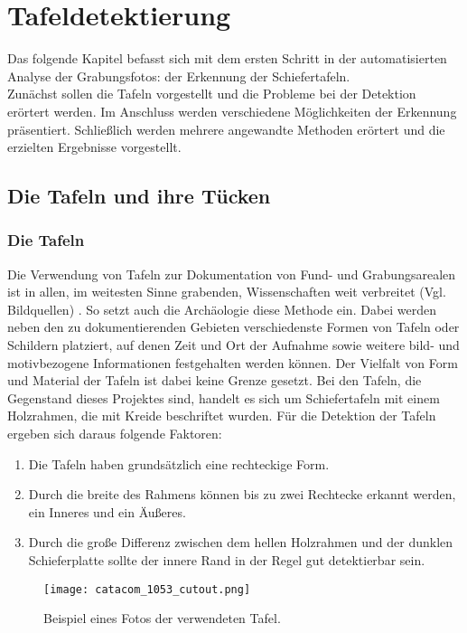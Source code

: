 \section{Tafeldetektierung}

Das folgende Kapitel befasst sich mit dem ersten Schritt in der automatisierten Analyse der Grabungsfotos: der Erkennung der Schiefertafeln.\\
Zunächst sollen die Tafeln vorgestellt und die Probleme bei der Detektion erörtert werden. Im Anschluss werden verschiedene Möglichkeiten der Erkennung präsentiert. Schließlich werden mehrere angewandte Methoden erörtert und die erzielten Ergebnisse vorgestellt.

\subsection{Die Tafeln und ihre Tücken}

\subsubsection{Die Tafeln}

Die Verwendung von Tafeln zur Dokumentation von Fund- und Grabungsarealen ist in allen, im weitesten Sinne grabenden, Wissenschaften weit verbreitet (Vgl. Bildquellen) . So setzt auch die Archäologie diese Methode ein. Dabei werden neben den zu dokumentierenden Gebieten verschiedenste Formen von Tafeln oder Schildern platziert, auf denen Zeit und Ort der Aufnahme sowie weitere bild- und motivbezogene Informationen festgehalten werden können. Der Vielfalt von Form und Material der Tafeln ist dabei keine Grenze gesetzt.
Bei den Tafeln, die Gegenstand dieses Projektes sind, handelt es sich um Schiefertafeln mit einem Holzrahmen, die mit Kreide beschriftet wurden. Für die Detektion der Tafeln ergeben sich daraus folgende Faktoren:\\
\begin{enumerate}
\item Die Tafeln haben grundsätzlich eine rechteckige Form.
\item Durch die breite des Rahmens können bis zu zwei Rechtecke erkannt werden, ein Inneres und ein Äußeres.
\item Durch die große Differenz zwischen dem hellen Holzrahmen und der dunklen Schieferplatte sollte der innere Rand in der Regel gut detektierbar sein.
\end{enumerate}
\begin{SCfigure}[0.5][h]
\caption{Beispiel eines Fotos der verwendeten Tafel.}
\texttt{[image: catacom\_1053\_cutout.png]}
\end{SCfigure}


